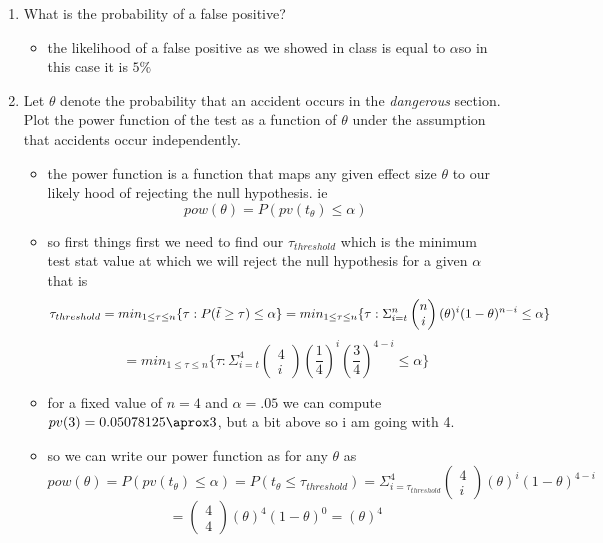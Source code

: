 \documentclass[12pt,twoside]{article}
\begin{document}
\begin{enumerate}
\begin{enumerate}
\item What is the probability of a false positive?
\begin{itemize}
    \color{blue}
    \item the likelihood of a false positive as we showed in class is equal to $\alpha$so in this case it is $5\%$ 
\end{itemize}
\item Let $\theta$ denote the probability that an accident occurs in the \emph{dangerous} section. Plot the power function of the test as a function of $\theta$ under the assumption that accidents occur independently. 
\begin{itemize}
    \color{blue}
    \item  the power function is a function that maps any given effect size $\theta$ to our likely hood of rejecting the null hypothesis. ie $$pow(\theta)=P(pv(t_{\theta})\leq \alpha) $$
\item so first things first we need to find our $\tau_{threshold}$ which is the minimum test stat value at which we will reject the null hypothesis for a given $\alpha$ that is $$\tau_{threshold}=min_{1\leq \tau\leq n}\{\tau:P(\Tilde{t}\geq \tau)\leq \alpha\}=min_{1\leq \tau\leq n}\{\tau:\Sigma_{i=t}^{n}\begin{pmatrix}n\\i\end{pmatrix}(\theta)^{i}(1-\theta)^{n-i}\leq \alpha\}$$$$=min_{1\leq \tau\leq n}\{\tau:\Sigma_{i=t}^{4}\begin{pmatrix}4\\i\end{pmatrix}(\frac{1}{4})^{i}(\frac{3}{4})^{4-i}\leq \alpha\}$$
\item for a fixed value of $n=4$ and $\alpha=.05$ we can compute $pv(3)=0.05078125\aprox 3$, but a bit above so i am going with 4. 
\item so we can write our power function as for any $\theta$ as  $$pow(\theta)=P(pv(t_{\theta})\leq \alpha)=P(t_{\theta}\leq \tau_{threshold})= \Sigma_{i=\tau_{threshold}}
^{4}\begin{pmatrix}4\\i\end{pmatrix}(\theta)^{i}(1-\theta)^{4-i}$$ $$=\begin{pmatrix}4\\4\end{pmatrix}(\theta)^{4}(1-\theta)^{0}=(\theta)^4$$


\end{itemize}
\end{enumerate}
\end{enumerate}
\end{document}
